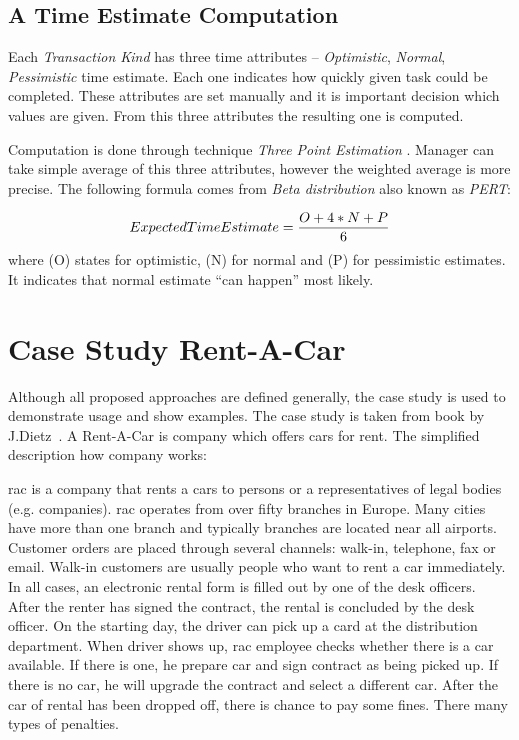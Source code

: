 \subsection{A Time Estimate Computation}
Each \textit{Transaction Kind} has three time attributes -- \textit{Optimistic}, \textit{Normal}, \textit{Pessimistic} time estimate. Each one indicates how quickly given task could be completed. These attributes are set manually and it is important decision which values are given. From this three attributes the resulting one is computed.  

Computation is done through technique \textit{Three Point Estimation} \cite{beta-distribution}. 
Manager can take simple average of this three attributes, however the weighted average is more precise.
The following formula comes from \textit{Beta distribution} also known as \textit{PERT}:

\begin{displaymath}
\centering
ExpectedTimeEstimate = \frac{O + 4*N + P}{6}
\end{displaymath}
where (O) states for optimistic, (N) for normal and (P) for pessimistic estimates. It indicates that normal estimate ``can happen'' most likely.
\section{Case Study Rent-A-Car}
Although all proposed approaches are defined generally, the case study is used to demonstrate usage and show examples. The case study is taken from book by J.Dietz~\cite{dietz-essence-2015}. A Rent-A-Car is company which offers cars for rent. The simplified description how company works:

\gls{rac} is a company that rents a cars to persons or a representatives of legal bodies (e.g. companies). \gls{rac} operates from over fifty branches in Europe. Many cities have more than one branch and typically branches are located near all airports. 
Customer orders are placed through several channels: walk-in, telephone, fax or email. Walk-in customers are usually people who want to rent a car immediately. In all cases, an electronic rental form is filled out by one of the desk officers. 
After the renter has signed the contract, the rental is concluded by the desk officer. On the starting day, the driver can pick up a card at the distribution department. When driver shows up, \gls{rac} employee checks whether there is a car available. If there is one, he prepare car and sign contract as being picked up. If there is no car, he will upgrade the contract and select a different car. 
After the car of rental has been dropped off, there is chance to pay some fines. There many types of penalties.

